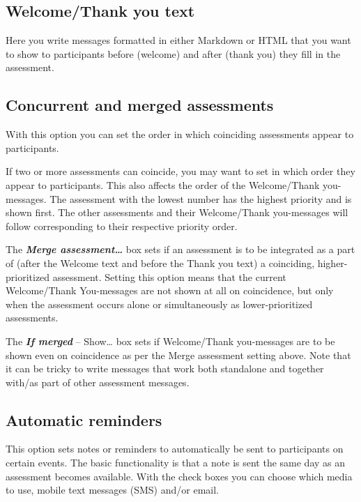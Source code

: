 \documentclass[]{book}
\begin{document}
\hypertarget{welcomethank-you-text}{%
\subsection{Welcome/Thank you text}\label{welcomethank-you-text}}

Here you write messages formatted in either Markdown or HTML that you want to show to participants before (welcome) and after (thank you) they fill in the assessment.

\hypertarget{concurrent-and-merged-assessments}{%
\subsection{Concurrent and merged assessments}\label{concurrent-and-merged-assessments}}

With this option you can set the order in which coinciding assessments appear to participants.

If two or more assessments can coincide, you may want to set in which order they appear to participants. This also affects the order of the Welcome/Thank you-messages. The assessment with the lowest number has the highest priority and is shown first. The other assessments and their Welcome/Thank you-messages will follow corresponding to their respective priority order.

The \textbf{\emph{Merge assessment\ldots{}}} box sets if an assessment is to be integrated as a part of (after the Welcome text and before the Thank you text) a coinciding, higher-prioritized assessment. Setting this option means that the current Welcome/Thank You-messages are not shown at all on coincidence, but only when the assessment occurs alone or simultaneously as lower-prioritized assessments.

The \textbf{\emph{If merged}} -- Show\ldots{} box sets if Welcome/Thank you-messages are to be shown even on coincidence as per the Merge assessment setting above. Note that it can be tricky to write messages that work both standalone and together with/as part of other assessment messages.

\hypertarget{automatic-reminders}{%
\subsection{Automatic reminders}\label{automatic-reminders}}

This option sets notes or reminders to automatically be sent to participants on certain events. The basic functionality is that a note is sent the same day as an assessment becomes available. With the check boxes you can choose which media to use, mobile text messages (SMS) and/or email.
\end{document}

